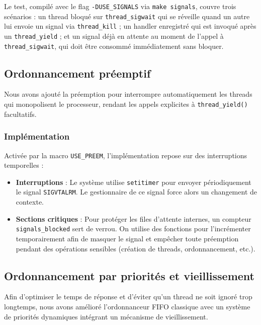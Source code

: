 Le test, compilé avec le flag \texttt{-DUSE\_SIGNALS} via \texttt{make signals},
couvre trois scénarios : un thread bloqué sur \texttt{thread\_sigwait}
qui se réveille quand un autre lui envoie un signal via \texttt{thread\_kill} ;
un handler enregistré qui est invoqué après un \texttt{thread\_yield} ; et un
signal déjà en attente au moment de l'appel à \texttt{thread\_sigwait}, qui
doit être consommé immédiatement sans bloquer.


\subsection{Ordonnancement préemptif}

Nous avons ajouté la préemption pour interrompre automatiquement les threads qui monopolisent le processeur, 
rendant les appels explicites à \texttt{thread\_yield()} facultatifs.

\subsubsection{Implémentation}

Activée par la macro \texttt{USE\_PREEM}, l'implémentation repose sur des interruptions temporelles :

\begin{itemize}
    \item \textbf{Interruptions} : Le système utilise \texttt{setitimer} pour envoyer périodiquement le signal \texttt{SIGVTALRM}. 
    Le gestionnaire de ce signal force alors un changement de contexte.
    \item \textbf{Sections critiques} : Pour protéger les files d'attente internes, 
    un compteur \texttt{signals\_blocked} sert de verrou. 
    On utilise des fonctions pour l'incrémenter temporairement afin de masquer le signal et empêcher toute préemption pendant des opérations sensibles (création de threads, ordonnancement, etc.).
\end{itemize}


\subsection{Ordonnancement par priorités et vieillissement}

Afin d'optimiser le temps de réponse et d'éviter qu'un thread ne soit ignoré trop longtemps, nous avons amélioré l'ordonnanceur FIFO classique avec un système de priorités dynamiques intégrant un mécanisme de vieillissement.

